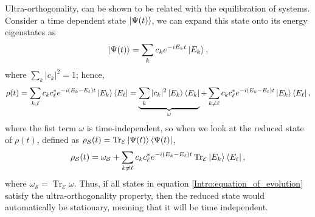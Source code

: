 \indent Ultra-orthogonality, can be shown to be related with the equilibration of systems. Consider a time dependent state $\mathinner{|{\Psi(t)}\rangle}$, we can expand this state onto its energy eigenstates as
\begin{equation}
\mathinner{|{\Psi(t)}\rangle}=\sum_{k} c_k e^{-iE_kt}\mathinner{|{E_k}\rangle},
\end{equation}
where $\sum_k|c_k|^2=1$; hence,
\begin{equation}
\rho(t) = \sum_{ k,\ell}c_kc^*_\ell e^{-i(E_k-E_\ell)t}\mathinner{|{E_k}\rangle}\mathinner{\langle{E_\ell}|} = \underbrace{\sum_{ k}|c_k|^2 \mathinner{|{E_k}\rangle}\mathinner{\langle{E_k}|}}_{\omega}+\sum_{ k\neq\ell}c_kc^*_\ell e^{-i(E_k-E_\ell)t}\mathinner{|{E_k}\rangle}\mathinner{\langle{E_\ell}|},
\end{equation}
where the fist term $\omega$ is time-independent, so when we look at the reduced state of $\rho(t)$, defined as  $ \rho_{\mathcal{S}}(t) = \operatorname{Tr}_{\mathcal{E}} \mathinner{|{\Psi(t)}\rangle}\mathinner{\langle{\Psi(t)}|}$,
\begin{equation}
\rho_{\mathcal{S}}(t) =\omega_{\mathcal{S}} + \sum_{ k\neq\ell}c_kc^*_\ell e^{-i(E_k-E_\ell)t}\operatorname{Tr}_{\mathcal{E}}\mathinner{|{E_k}\rangle}\mathinner{\langle{E_\ell}|},
\label{Intro:equation_of_evolution}
\end{equation}
where $\omega_{\mathcal{S}} = \operatorname{Tr}_{\mathcal{E}} \omega$.  Thus, if all states in equation \eqref{Intro:equation_of_evolution} satisfy the ultra-orthogonality property, then the reduced state would automatically be stationary, meaning that it will be time independent.\\



